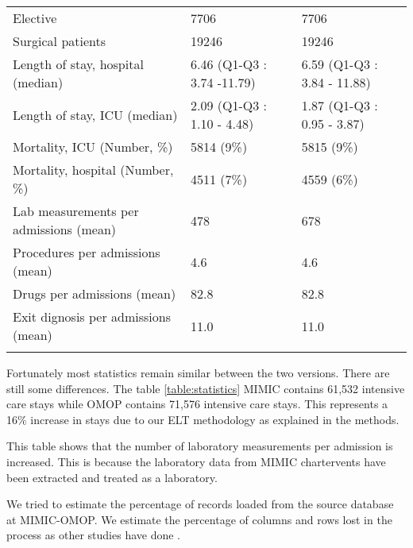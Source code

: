 \begin{table*}[t]
\begin{tabular}{@{}lll@{}}
Elective                               & 7706                        & 7706                               \\
Surgical patients                      & 19246                       & 19246                              \\
Length of stay, hospital (median)      & 6.46 (Q1-Q3 : 3.74 -11.79)  & 6.59 (Q1-Q3 : 3.84 - 11.88)        \\
Length of stay, ICU (median)           & 2.09 (Q1-Q3 : 1.10 - 4.48)  & 1.87 (Q1-Q3 : 0.95 - 3.87)         \\
Mortality, ICU (Number, \%)            & 5814 (9\%)                  & 5815 (9\%)                         \\
Mortality, hospital (Number, \%)       & 4511 (7\%)                  & 4559 (6\%)                         \\
Lab measurements per admissions (mean) & 478                         & 678                                \\
Procedures per admissions (mean)       & 4.6                         & 4.6                                \\
Drugs per admissions (mean)            & 82.8                        & 82.8                               \\
Exit dignosis per admissions (mean)    & 11.0                        & 11.0                               \\\botrule
\end{tabular}
\label{table:statistics}
\end{table*}

Fortunately most statistics remain similar between the two versions. 
There are still some differences. 
The table \ref{table:statistics} MIMIC contains 61,532 intensive care stays while 
OMOP contains 71,576 intensive care stays. This represents a 16\% increase in 
stays due to our ELT methodology as explained in the methods.
                    
This table shows that the number of laboratory measurements 
per admission is increased. This is because the laboratory data from MIMIC 
chartervents have been extracted and treated as a laboratory.

We tried to estimate the percentage of records loaded from the source database 
at MIMIC-OMOP. We estimate the percentage of columns and rows lost in 
the process as other studies have done \cite{omop-nashville}.
                    
